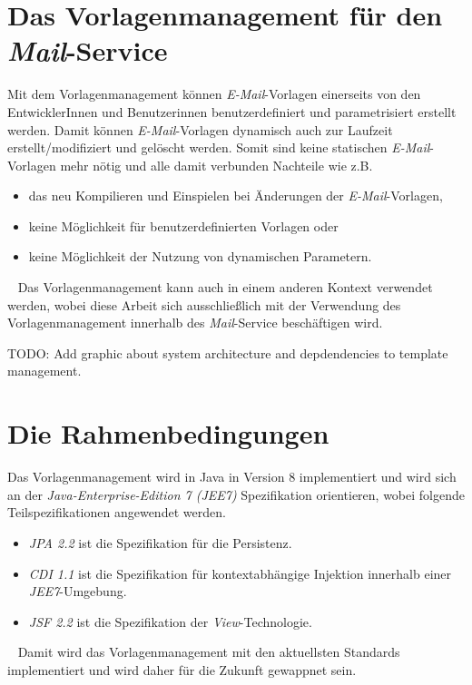 \section{Das Vorlagenmanagement für den \emph{Mail}-Service}
Mit dem Vorlagenmanagement können \emph{E-Mail}-Vorlagen einerseits von den EntwicklerInnen und Benutzerinnen benutzerdefiniert und parametrisiert erstellt werden. Damit können \emph{E-Mail}-Vorlagen dynamisch auch zur Laufzeit erstellt/modifiziert und gelöscht werden. Somit sind keine statischen \emph{E-Mail}-Vorlagen mehr nötig und alle damit verbunden Nachteile wie z.B. 
\begin{itemize}
	\item das neu Kompilieren und Einspielen bei Änderungen der \emph{E-Mail}-Vorlagen,
	\item keine Möglichkeit für benutzerdefinierten Vorlagen oder
	\item keine Möglichkeit der Nutzung von dynamischen Parametern.
\end{itemize}
\ \newline
Das Vorlagenmanagement kann auch in einem anderen Kontext verwendet werden, wobei diese Arbeit sich  ausschließlich mit der Verwendung des Vorlagenmanagement innerhalb des \emph{Mail}-Service beschäftigen wird. 

TODO: Add graphic about system architecture and depdendencies to template management.

\section{Die Rahmenbedingungen}
Das Vorlagenmanagement wird in Java in Version 8 implementiert und wird sich an der \emph{Java-Enterprise-Edition 7 (JEE7)} Spezifikation orientieren, wobei folgende Teilspezifikationen angewendet werden.
\begin{itemize}
	\item \emph{JPA 2.2} ist die Spezifikation für die Persistenz.
	\item \emph{CDI 1.1} ist die Spezifikation für kontextabhängige Injektion innerhalb einer \emph{JEE7}-Umgebung.
	\item \emph{JSF 2.2} ist die Spezifikation der \emph{View}-Technologie. 
\end{itemize}
\ \newline
Damit wird das Vorlagenmanagement mit den aktuellsten Standards implementiert und wird daher für die Zukunft gewappnet sein.

